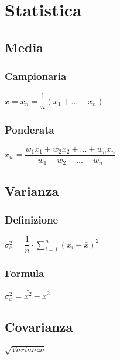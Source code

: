 
\chapter{Statistica}
\section{Media}
\subsection{Campionaria}
$\bar{x} = \bar{x_n} = \dfrac{1}{n} (x_1 + ... + x_n)$
\subsection{Ponderata}
$\bar{x_w} = \dfrac{w_1x_1 + w_2x_2 + ... + w_nx_n}{w_1 + w_2 + ... + w_n}$
\section{Varianza}
\subsection{Definizione}
$\sigma_x^2 = \displaystyle \dfrac{1}{n} \cdot \sum_{i = 1}^{n}(x_i	- \bar{x})^2$
\subsection{Formula}
$\sigma_x^2 = \bar{x^2} - \bar{x}^2$
\section{Covarianza}
$\sqrt{Varianza}$